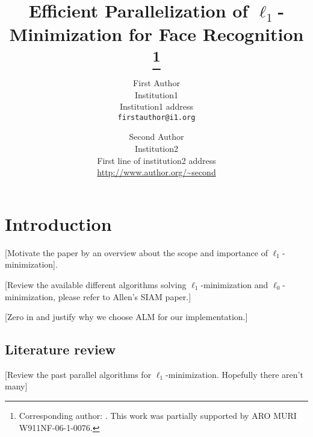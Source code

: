 \documentclass[10pt,twocolumn,letterpaper]{article}
\begin{document}
\title{Efficient Parallelization of $\ell_1$-Minimization for Face Recognition
\thanks{Corresponding author: . This work was partially supported by ARO MURI W911NF-06-1-0076.}}

\author{First Author\\
Institution1\\
Institution1 address\\
{\tt\small firstauthor@i1.org}
\and
Second Author\\
Institution2\\
First line of institution2 address\\
{\small\url{http://www.author.org/~second}}
}

\maketitle

\begin{abstract}

\end{abstract}

\section{Introduction} 

[Motivate the paper by an overview about the scope and importance of $\ell_1$-minimization].

[Review the available different algorithms solving $\ell_1$-minimization and $\ell_0$-minimization, please refer to Allen's SIAM paper.]

[Zero in and justify why we choose ALM for our implementation.]

\subsection{Literature review}
[Review the past parallel algorithms for $\ell_1$-minimization. Hopefully there aren't many]
\end{document}
